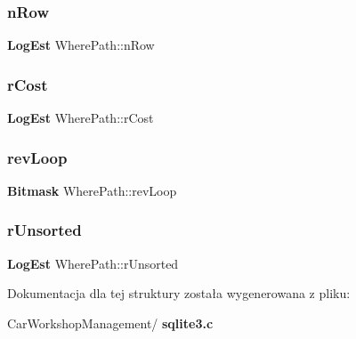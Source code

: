 \mbox{\label{struct_where_path_ab9e893b128d34fc8bc832de593387c99}} 
\subsubsection{nRow}
{\footnotesize\ttfamily \textbf{ Log\+Est} Where\+Path\+::n\+Row}

\mbox{\label{struct_where_path_a8ca2a9ddc42527170167eb6f08d85878}} 
\subsubsection{rCost}
{\footnotesize\ttfamily \textbf{ Log\+Est} Where\+Path\+::r\+Cost}

\mbox{\label{struct_where_path_a6f6bf0a804430fb08f4aadc506f5cc14}} 
\subsubsection{revLoop}
{\footnotesize\ttfamily \textbf{ Bitmask} Where\+Path\+::rev\+Loop}

\mbox{\label{struct_where_path_a69b10c1c4a8e00814f80144dad12c4ad}} 
\subsubsection{rUnsorted}
{\footnotesize\ttfamily \textbf{ Log\+Est} Where\+Path\+::r\+Unsorted}



Dokumentacja dla tej struktury została wygenerowana z pliku\+:\begin{DoxyCompactItemize}
\item 
Car\+Workshop\+Management/\textbf{ sqlite3.\+c}\end{DoxyCompactItemize}
